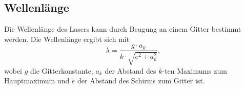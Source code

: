 \subsection{Wellenlänge}\label{sec:wellenlaenge}
Die Wellenlänge des Lasers kann durch Beugung an einem Gitter bestimmt werden. Die Wellenlänge ergibt sich mit
\begin{equation*}
    \lambda = \frac{g \cdot a_k}{k \cdot \sqrt{e^2 + a_k^2}},
\end{equation*}
wobei $g$ die Gitterkonstante, $a_k$ der Abstand des $k$-ten Maximums zum Hauptmaximum und $e$ der Abstand des Schirms zum Gitter ist.\\
\newpage

